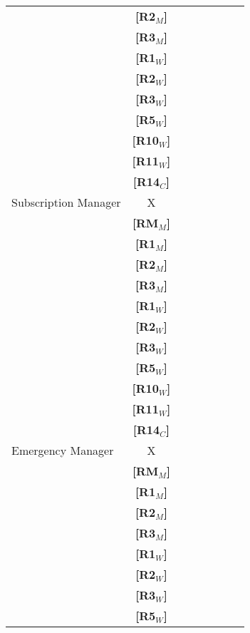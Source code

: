 \begin{tabular}{l*{6}{c}r}
                        & \textbf{[R2$_M$]}\\
                        & \textbf{[R3$_M$]}\\
                        & \textbf{[R1$_W$]}\\
                        & \textbf{[R2$_W$]}\\
                        & \textbf{[R3$_W$]}\\
                        & \textbf{[R5$_W$]}\\
                        & \textbf{[R10$_W$]}\\
                        & \textbf{[R11$_W$]}\\
                        & \textbf{[R14$_C$]}\\

    \hline
    Subscription Manager & X   \\
                        & \textbf{[RM$_M$]}\\
                        & \textbf{[R1$_M$]}\\
                        & \textbf{[R2$_M$]}\\
                        & \textbf{[R3$_M$]}\\
                        & \textbf{[R1$_W$]}\\
                        & \textbf{[R2$_W$]}\\
                        & \textbf{[R3$_W$]}\\
                        & \textbf{[R5$_W$]}\\
                        & \textbf{[R10$_W$]}\\
                        & \textbf{[R11$_W$]}\\
                        & \textbf{[R14$_C$]}\\
    \hline
    Emergency Manager & X   \\
                        & \textbf{[RM$_M$]}\\
                        & \textbf{[R1$_M$]}\\
                        & \textbf{[R2$_M$]}\\
                        & \textbf{[R3$_M$]}\\
                        & \textbf{[R1$_W$]}\\
                        & \textbf{[R2$_W$]}\\
                        & \textbf{[R3$_W$]}\\
                        & \textbf{[R5$_W$]}\\

\end{tabular}
